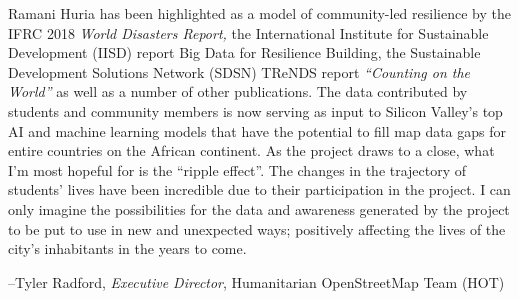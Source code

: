 \documentclass[a4paper,12pt,twoside]{article}
\begin{document}
\begin{multicols}{2}
Ramani Huria has been highlighted as a model of community-led resilience by the IFRC 2018 \textit{World Disasters Report,} the International Institute for Sustainable Development (IISD) report Big Data for Resilience Building, the Sustainable Development Solutions Network (SDSN) TReNDS report \textit{“Counting on the World”} as well as a number of other publications. The data contributed by students and community members is now serving as input to Silicon Valley’s top AI and machine learning models that have the potential to fill map data gaps for entire countries on the African continent. As the project draws to a close, what I’m most hopeful for is the “ripple effect”. The changes in the trajectory of students’ lives have been incredible due to their participation in the project. I can only imagine the possibilities for the data and awareness generated by the project to be put to use in new and unexpected ways; positively affecting the lives of the city’s inhabitants in the years to come.
\end{multicols}

--Tyler Radford, \textit{Executive Director}, Humanitarian OpenStreetMap Team (HOT)
\clearpage

\newpage
\end{document}
